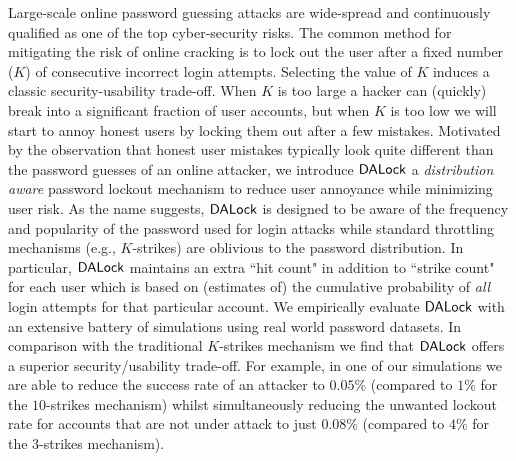 
Large-scale online password guessing attacks are wide-spread and continuously qualified as one of the top cyber-security risks. The common method for mitigating the risk of online cracking is to lock out the user after a fixed number ($K$) of consecutive incorrect login attempts. Selecting the value of $K$ induces a classic security-usability trade-off. When $K$ is too large a hacker can (quickly) break into a significant fraction of user accounts, but when $K$ is too low we will start to annoy honest users by locking them out after a few mistakes. Motivated by the observation that honest user mistakes typically look quite different than the password guesses of an online attacker, we introduce $\mathsf{DALock}$ a {\em distribution aware} password lockout mechanism to reduce user annoyance while minimizing user risk. As the name suggests, $\mathsf{DALock}$ is designed to be aware of the frequency and popularity of the password used for login attacks while standard throttling mechanisms (e.g., $K$-strikes) are oblivious to the password distribution. In particular, $\mathsf{DALock}$ maintains an extra ``hit count" in addition to ``strike count" for each user which is based on (estimates of) the cumulative probability of {\em all} login attempts for that particular account. We empirically evaluate $\mathsf{DALock}$ with an extensive battery of simulations using real world password datasets. In comparison with the traditional $K$-strikes mechanism we find that $\mathsf{DALock}$ offers a superior security/usability trade-off. For example, in one of our simulations we are able to  reduce the success rate of an attacker to $0.05\%$ (compared to $1\%$ for the $10$-strikes mechanism) whilst simultaneously reducing the unwanted lockout rate for accounts that are not under attack to just $0.08\%$ (compared to $4\%$ for the $3$-strikes mechanism).  